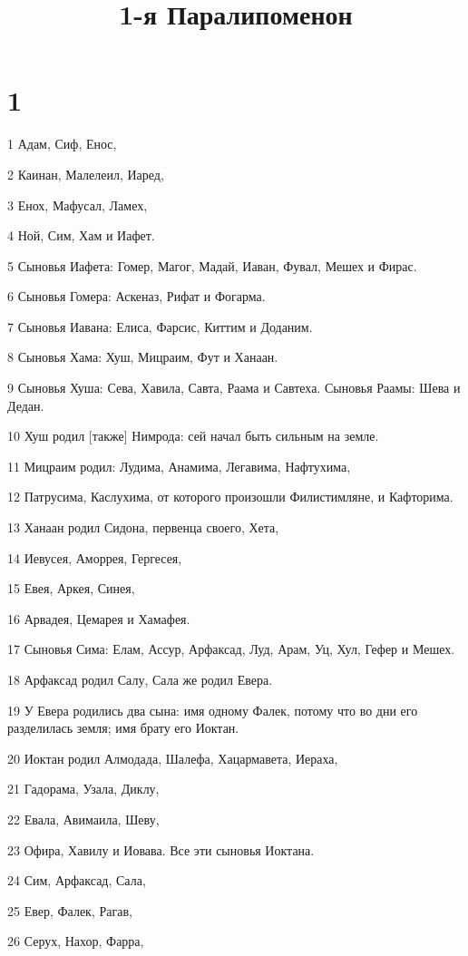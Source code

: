 

\title{1-я Паралипоменон}


\chapter{1}

\par 1 Адам, Сиф, Енос,
\par 2 Каинан, Малелеил, Иаред,
\par 3 Енох, Мафусал, Ламех,
\par 4 Ной, Сим, Хам и Иафет.
\par 5 Сыновья Иафета: Гомер, Магог, Мадай, Иаван, Фувал, Мешех и Фирас.
\par 6 Сыновья Гомера: Аскеназ, Рифат и Фогарма.
\par 7 Сыновья Иавана: Елиса, Фарсис, Киттим и Доданим.
\par 8 Сыновья Хама: Хуш, Мицраим, Фут и Ханаан.
\par 9 Сыновья Хуша: Сева, Хавила, Савта, Раама и Савтеха. Сыновья Раамы: Шева и Дедан.
\par 10 Хуш родил [также] Нимрода: сей начал быть сильным на земле.
\par 11 Мицраим родил: Лудима, Анамима, Легавима, Нафтухима,
\par 12 Патрусима, Каслухима, от которого произошли Филистимляне, и Кафторима.
\par 13 Ханаан родил Сидона, первенца своего, Хета,
\par 14 Иевусея, Аморрея, Гергесея,
\par 15 Евея, Аркея, Синея,
\par 16 Арвадея, Цемарея и Хамафея.
\par 17 Сыновья Сима: Елам, Ассур, Арфаксад, Луд, Арам, Уц, Хул, Гефер и Мешех.
\par 18 Арфаксад родил Салу, Сала же родил Евера.
\par 19 У Евера родились два сына: имя одному Фалек, потому что во дни его разделилась земля; имя брату его Иоктан.
\par 20 Иоктан родил Алмодада, Шалефа, Хацармавета, Иераха,
\par 21 Гадорама, Узала, Диклу,
\par 22 Евала, Авимаила, Шеву,
\par 23 Офира, Хавилу и Иовава. Все эти сыновья Иоктана.
\par 24 Сим, Арфаксад, Сала,
\par 25 Евер, Фалек, Рагав,
\par 26 Серух, Нахор, Фарра,
